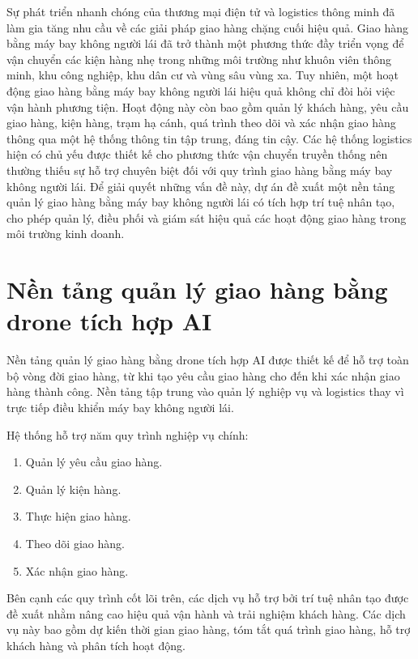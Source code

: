 
Sự phát triển nhanh chóng của thương mại điện tử và logistics thông minh đã làm gia tăng nhu cầu về các giải pháp giao hàng chặng cuối hiệu quả. Giao hàng bằng máy bay không người lái đã trở thành một phương thức đầy triển vọng để vận chuyển các kiện hàng nhẹ trong những môi trường như khuôn viên thông minh, khu công nghiệp, khu dân cư và vùng sâu vùng xa. Tuy nhiên, một hoạt động giao hàng bằng máy bay không người lái hiệu quả không chỉ đòi hỏi việc vận hành phương tiện. Hoạt động này còn bao gồm quản lý khách hàng, yêu cầu giao hàng, kiện hàng, trạm hạ cánh, quá trình theo dõi và xác nhận giao hàng thông qua một hệ thống thông tin tập trung, đáng tin cậy. Các hệ thống logistics hiện có chủ yếu được thiết kế cho phương thức vận chuyển truyền thống nên thường thiếu sự hỗ trợ chuyên biệt đối với quy trình giao hàng bằng máy bay không người lái. Để giải quyết những vấn đề này, dự án đề xuất một nền tảng quản lý giao hàng bằng máy bay không người lái có tích hợp trí tuệ nhân tạo, cho phép quản lý, điều phối và giám sát hiệu quả các hoạt động giao hàng trong môi trường kinh doanh.

\section{Nền tảng quản lý giao hàng bằng drone tích hợp AI}\label{s:introduction}

Nền tảng quản lý giao hàng bằng drone tích hợp AI được thiết kế để hỗ trợ toàn bộ vòng đời giao hàng, từ khi tạo yêu cầu giao hàng cho đến khi xác nhận giao hàng thành công. Nền tảng tập trung vào quản lý nghiệp vụ và logistics thay vì trực tiếp điều khiển máy bay không người lái.

Hệ thống hỗ trợ năm quy trình nghiệp vụ chính:

\begin{enumerate}
\item Quản lý yêu cầu giao hàng.
\item Quản lý kiện hàng.
\item Thực hiện giao hàng.
\item Theo dõi giao hàng.
\item Xác nhận giao hàng.
\end{enumerate}

Bên cạnh các quy trình cốt lõi trên, các dịch vụ hỗ trợ bởi trí tuệ nhân tạo được đề xuất nhằm nâng cao hiệu quả vận hành và trải nghiệm khách hàng. Các dịch vụ này bao gồm dự kiến thời gian giao hàng, tóm tắt quá trình giao hàng, hỗ trợ khách hàng và phân tích hoạt động.

